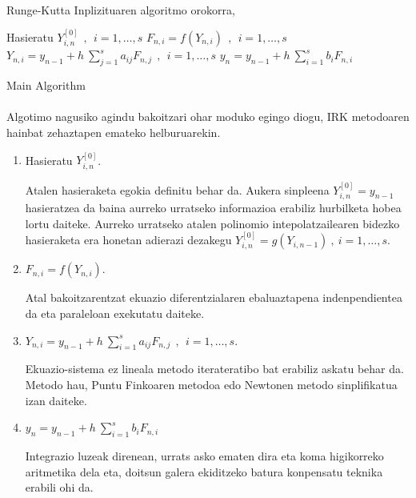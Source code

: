 \paragraph*{}Runge-Kutta Inplizituaren algoritmo orokorra,

\begin{algorithm}[H]
 \BlankLine
  {
   \BlankLine
   Hasieratu  $Y_{i,n}^{[0]} \ \ , \ \ i=1,\dots,s $\;
    \BlankLine
   {
    \BlankLine 
    $F_{n,i}=f(Y_{n,i}) \ \ , \ \  i=1,\dots,s$\;
    $Y_{n,i}=y_{n-1}+ h \ \sum\limits_{j=1}^{s} a_{ij} F_{n,j}  \ \ , \ \  i=1,\dots,s$\;  
   }
   \BlankLine
    $y_{n}=y_{n-1}+ h \ \sum\limits_{i=1}^{s} b_i F_{n,i} $\;
   \BlankLine
 }
 \caption{Main Algorithm}
\end{algorithm}

\paragraph*{}Algotimo nagusiko agindu bakoitzari ohar moduko egingo diogu, IRK metodoaren hainbat zehaztapen emateko helburuarekin.
\begin{enumerate}
\item Hasieratu  $Y_{i,n}^{[0]}$.

Atalen hasieraketa egokia definitu behar da. Aukera sinpleena $Y_{i,n}^{[0]}=y_{n-1}$ hasieratzea da baina aurreko urratseko informazioa erabiliz hurbilketa hobea lortu daiteke. Aurreko urratseko atalen polinomio intepolatzailearen bidezko hasieraketa era honetan adierazi dezakegu  $Y_{i,n}^{[0]}=g(Y_{i,n-1}) \ , \ i=1, \dots, s$.      

\item $F_{n,i}=f(Y_{n,i})$.

Atal bakoitzarentzat ekuazio diferentzialaren ebaluaztapena indenpendientea da eta paraleloan exekutatu daiteke.

\item   $Y_{n,i}=y_{n-1}+ h \ \sum\limits_{i=1}^{s} a_{ij} F_{n,j}  \ \ , \ \  i=1,\dots,s$.

Ekuazio-sistema ez lineala metodo iterateratibo bat erabiliz askatu behar da. Metodo hau, Puntu Finkoaren metodoa edo Newtonen metodo sinplifikatua izan daiteke.  

\item $y_{n}=y_{n-1}+ h \ \sum\limits_{i=1}^{s} b_i F_{n,i} $\;

Integrazio luzeak direnean, urrats asko ematen dira eta koma higikorreko aritmetika dela eta, doitsun galera ekiditzeko batura konpensatu teknika erabili ohi da.


\end{enumerate} 

